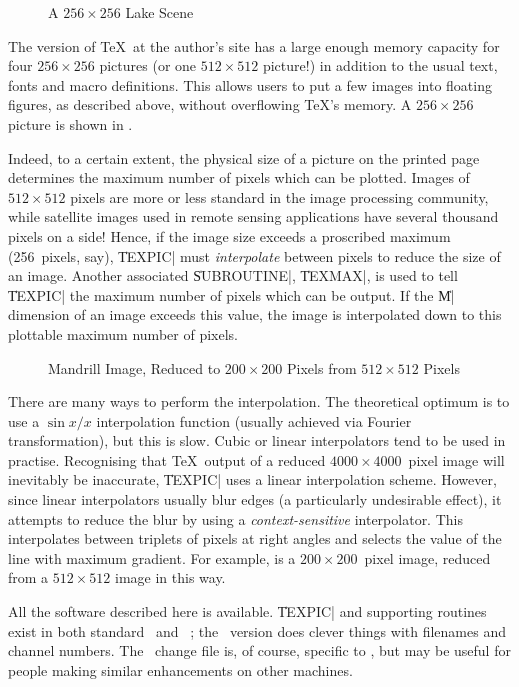 \begin{figure*}
   \centering
   \fbox{\relax}
   \caption{A $256 \times 256$ Lake Scene}
\end{figure*}

The version of \TeX\ at the author's site has a large enough memory 
capacity for four $256 \times 256$ pictures (or one $512 \times 512$ 
picture!) in addition to the usual text, fonts and macro definitions.
This allows users to put a few images into floating figures, as 
described above, without overflowing \TeX's memory. A $256 \times 256$ 
picture is shown in .

Indeed, to a certain extent, the physical size of a picture on the 
printed page determines the maximum number of pixels which can be 
plotted. Images of $512 \times 512$ pixels are more or less standard in 
the image processing community, while satellite images used in remote 
sensing applications have several thousand pixels on a side! Hence, if 
the image size exceeds a proscribed maximum (256~pixels, say), 
\|TEXPIC| must {\em interpolate} between pixels to reduce the size of an 
image. Another associated \|SUBROUTINE|, \|TEXMAX|, is used to tell 
\|TEXPIC| the maximum number of pixels which can be output. If the \|M| 
dimension of an image exceeds this value, the image is interpolated down 
to this plottable maximum number of pixels.

\begin{figure*}
   \centering
   \fbox{\relax}
   \caption{Mandrill Image, Reduced to $200 \times 200$
       Pixels from $512 \times 512$ Pixels}
\end{figure*}

There are many ways to perform the interpolation. The theoretical 
optimum is to use a $\sin x / x$ interpolation function (usually 
achieved via Fourier transformation), but this is slow. Cubic or linear 
interpolators tend to be used in practise. Recognising that \TeX\ output 
of a reduced $4000 \times4000$~pixel image will inevitably be 
inaccurate, \|TEXPIC| uses a linear interpolation scheme. However, since 
linear interpolators usually blur edges (a particularly undesirable 
effect), it attempts to reduce the blur by using a {\em 
context-sensitive\/} interpolator. This interpolates between triplets of 
pixels at right angles and selects the value of the line with maximum 
gradient. For example,  is a $200 \times 200$~pixel image, reduced 
from a $512 \times 512$ image in this way.

All the software described here is available. \|TEXPIC| and supporting 
routines exist in both standard \FTN\ and \VAX\ \FTN; the \VAX\ version 
does clever things with filenames and channel numbers. The \bigTeX\ 
change file is, of course, specific to \VMS, but may be useful for 
people making similar enhancements on other machines.


